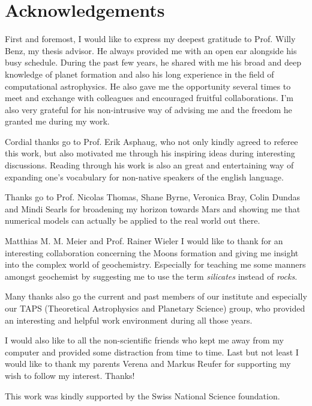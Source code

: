 \cleardoublepage
\chapter*{Acknowledgements}

First and foremost, I would like to express my deepest gratitude to Prof. Willy Benz, my thesis advisor. He always provided me with an open ear alongside his busy schedule. During the past few years, he shared with me his broad and deep knowledge of planet formation and also his long experience in the field of computational astrophysics. He also gave me the opportunity several times to meet and exchange with colleagues and encouraged fruitful collaborations. I'm also very grateful for his non-intrusive way of advising me and the freedom he granted me during my work.

Cordial thanks go to Prof. Erik Asphaug, who not only kindly agreed to referee this work, but also motivated me through his inspiring ideas during interesting discussions. Reading through his work is also an great and entertaining way of expanding one's vocabulary for non-native speakers of the english language.

Thanks go to Prof. Nicolas Thomas, Shane Byrne, Veronica Bray, Colin Dundas and Mindi Searls for broadening my horizon towards Mars and showing me that numerical models can actually be applied to the real world out there.

Matthias M. M. Meier and Prof. Rainer Wieler I would like to thank for an interesting collaboration concerning the Moons formation and giving me insight into the complex world of geochemistry. Especially for teaching me some manners amongst geochemist by suggesting me to use the term \emph{silicates} instead of \emph{rocks}.

Many thanks also go the current and past members of our institute and especially our TAPS (Theoretical Astrophysics and Planetary Science) group, who provided an interesting and helpful work environment during all those years.

I would also like to all the non-scientific friends who kept me away from my computer and provided some distraction from time to time. Last but not least I would like to thank my parents Verena and Markus Reufer for supporting my wish to follow my interest. Thanks!

This work was kindly supported by the Swiss National Science foundation.
